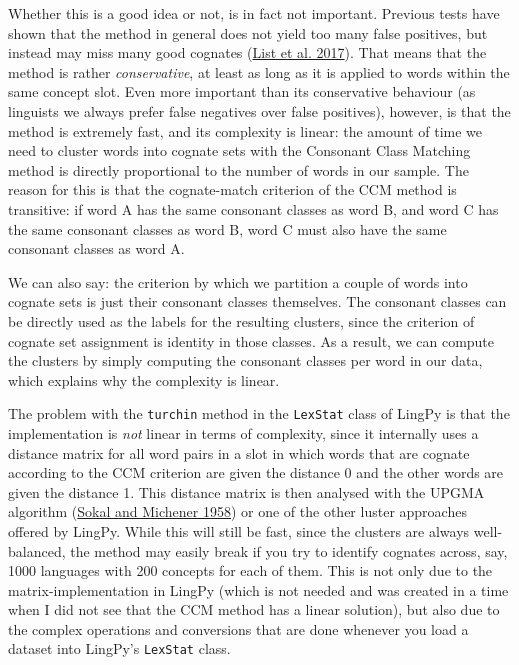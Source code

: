 \documentclass[
  english,
  a4paper,
  oneside,tablecaptionabove
]{scrbook}
\newcommand{\passthrough}[1]{#1}
\begin{document}
Whether this is a good idea or not, is in fact not important. Previous
tests have shown that the method in general does not yield too many
false positives, but instead may miss many good cognates (\href{http://bibliography.lingpy.org?key=List2017c}{List et al. 2017}).
That means that the method is rather \emph{conservative}, at least as
long as it is applied to words within the same concept slot. Even more
important than its conservative behaviour (as linguists we always prefer
false negatives over false positives), however, is that the method is
extremely fast, and its complexity is linear: the amount of time we need
to cluster words into cognate sets with the Consonant Class Matching
method is directly proportional to the number of words in our sample.
The reason for this is that the cognate-match criterion of the CCM
method is transitive: if word A has the same consonant classes as word
B, and word C has the same consonant classes as word B, word C must also
have the same consonant classes as word A.

We can also say: the criterion by which we partition a couple of words
into cognate sets is just their consonant classes themselves. The
consonant classes can be directly used as the labels for the resulting
clusters, since the criterion of cognate set assignment is identity in
those classes. As a result, we can compute the clusters by simply
computing the consonant classes per word in our data, which explains why
the complexity is linear.

The problem with the \passthrough{\lstinline!turchin!} method in the
\passthrough{\lstinline!LexStat!} class of LingPy is that the
implementation is \emph{not} linear in terms of complexity, since it
internally uses a distance matrix for all word pairs in a slot in which
words that are cognate according to the CCM criterion are given the
distance 0 and the other words are given the distance 1. This distance
matrix is then analysed with the UPGMA algorithm (\href{http://bibliography.lingpy.org?key=Sokal1958}{Sokal and Michener 1958}) or one of the other luster approaches offered by LingPy. While
this will still be fast, since the clusters are always well-balanced,
the method may easily break if you try to identify cognates across, say,
1000 languages with 200 concepts for each of them. This is not only due
to the matrix-implementation in LingPy (which is not needed and was
created in a time when I did not see that the CCM method has a linear
solution), but also due to the complex operations and conversions that
are done whenever you load a dataset into LingPy's
\passthrough{\lstinline!LexStat!} class.
\end{document}
